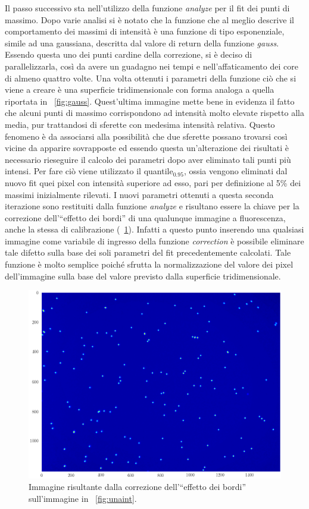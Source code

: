Il passo successivo sta nell'utilizzo della funzione \textit{analyze} per il fit dei punti di massimo. 
Dopo varie analisi si è notato che la funzione che al meglio descrive il comportamento dei massimi di intensità è una funzione di tipo esponenziale, simile ad una gaussiana, descritta dal valore di return della funzione \textit{gauss}. 
Essendo questa uno dei punti cardine della correzione, si è deciso di parallelizzarla, così da avere un guadagno nei tempi e nell'affaticamento dei core di almeno quattro volte.
Una volta ottenuti i parametri della funzione ciò che si viene a creare è una superficie tridimensionale con forma analoga a quella riportata in \figurename~\ref{fig:gauss}. 
Quest'ultima immagine mette bene in evidenza il fatto che alcuni punti di massimo corrispondono ad intensità molto elevate rispetto alla media, pur trattandosi di sferette con medesima intensità relativa.
Questo fenomeno è da associarsi alla possibilità che due sferette possano trovarsi così vicine da apparire sovrapposte ed essendo questa un'alterazione dei risultati è necessario rieseguire il calcolo dei parametri dopo aver eliminato tali punti più intensi. 
Per fare ciò viene utilizzato il quantile$_{0.95}$, ossia vengono eliminati dal nuovo fit quei pixel con intensità superiore ad esso, pari per definizione al 5\% dei massimi inizialmente rilevati.
I nuovi parametri ottenuti a questa seconda iterazione sono restituiti dalla funzione \textit{analyze} e risultano essere la chiave per la correzione dell'``effetto dei bordi'' di una qualunque immagine a fluorescenza, anche la stessa di calibrazione (\figurename~\ref{fig:unaintcorr}).
Infatti a questo punto inserendo una qualsiasi immagine come variabile di ingresso della funzione \textit{correction} è possibile eliminare tale difetto sulla base dei soli parametri del fit precedentemente calcolati. 
Tale funzione è molto semplice poiché sfrutta la normalizzazione del valore dei pixel dell'immagine sulla base del valore previsto dalla superficie tridimensionale.

\begin{figure}[h]
 \centering
 \includegraphics[scale=.60]{img/CAP3unaintcorr.png}
 \caption{\small{Immagine risultante dalla correzione dell'``effetto dei bordi'' sull'immagine in \figurename~\ref{fig:unaint}.}}
 \label{fig:unaintcorr}
\end{figure}

